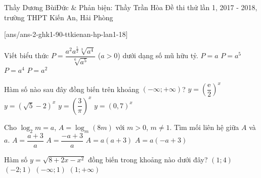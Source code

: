 \begin{name}
		{Thầy Dương BùiĐức \& Phản biện: Thầy Trần Hòa}
		{Đề thi thử lần 1, 2017 - 2018, trường THPT Kiến An, Hải Phòng}
	\end{name}
	\setcounter{ex}{0}\setcounter{bt}{0}
	[ans/ans-2-ghk1-90-ttkienan-hp-lan1-18]
\begin{ex}%
Viết biểu thức $P=\dfrac{a^{2}a^{\frac{5}{2}}\sqrt[3]{a^{4}}}{\sqrt[6]{a^{5}}}$ ($a>0$) dưới dạng số mũ hữu tỷ.
\choice
{$P=a$}
{\True $P=a^{5}$}
{$P=a^{4}$}
{$P=a^{2}$}
\end{ex}
\begin{ex}%
Hàm số nào sau đây đồng biến trên khoảng $(-\infty;+\infty)$?
\choice
{\True $y=\left(\dfrac{\mathrm{e}^{}}{2}\right)^{x}$}
{$y=(\sqrt{5}-2)^{x}$}
{$y=\left(\dfrac{3}{\pi}\right)^{x}$}
{$y=(0,7)^{x}$}
\end{ex}
\begin{ex}%
Cho $\log_{2}m=a$, $A=\log_{m}(8m)$ với $m>0$, $m\neq 1$. Tìm mối liên hệ giữa $A$ và $a$.
\choice
{\True $A=\dfrac{a+3}{a}$}
{$A=\dfrac{-a+3}{a}$}
{$A=a(a+3)$}
{$A=a(-a+3)$}
\end{ex}
\begin{ex}%
Hàm số $y=\sqrt{8+2x-x^{2}}$ đồng biến trong khoảng nào dưới đây?
\choice
{$(1;4)$}
{\True $(-2;1)$}
{$(-\infty;1)$}
{$(1;+\infty)$}
\end{ex}
